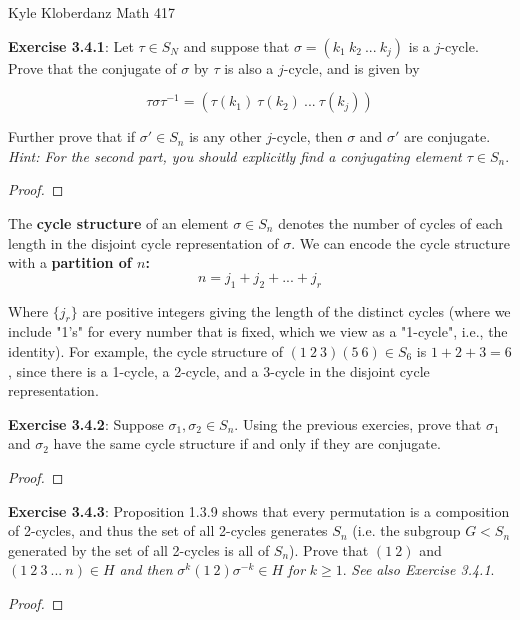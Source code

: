 \documentclass[a4paper]{article}
\begin{document}
\begin{myparindent}{0pt}

Kyle Kloberdanz \newline
Math 417 \newline

\textbf{Exercise 3.4.1}:
  Let $\tau \in S_N$ and suppose that $\sigma = (k_1 ~k_2 ~... ~k_j)$ is a
  $j$-cycle. Prove that the conjugate of $\sigma$ by $\tau$ is also a $j$-cycle,
  and is given by

  \[ \tau \sigma \tau^{-1} = (\tau(k_1) ~\tau(k_2) ~... ~\tau(k_j)) \]

  Further prove that if $\sigma' \in S_n$ is any other $j$-cycle, then $\sigma$
  and $\sigma'$ are conjugate. \textit{Hint: For the second part, you should
  explicitly find a conjugating element $\tau \in S_n$}.
\begin{proof}
\end{proof}

The \textbf{cycle structure} of an element $\sigma \in S_n$ denotes the number
of cycles of each length in the disjoint cycle representation of $\sigma$.
We can encode the cycle structure with a \textbf{partition of $n$:}
\[ n = j_1 + j_2 + ... + j_r \]

Where $\{ j_r \}$ are positive integers giving the length of the distinct cycles
(where we include "1's" for every number that is fixed, which we view as a
"1-cycle", i.e., the identity). For example, the cycle structure of
$(1 ~2 ~3)(5 ~6) \in S_6$ is $1 + 2 + 3 = 6$, since there is a 1-cycle, a
2-cycle, and a 3-cycle in the disjoint cycle representation.
\newline

\textbf{Exercise 3.4.2}:
Suppose $\sigma_1, \sigma_2 \in S_n$. Using the previous exercies, prove that
$\sigma_1$ and $\sigma_2$ have the same cycle structure if and only if they
are conjugate.
\begin{proof}
\end{proof}

\textbf{Exercise 3.4.3}:
Proposition 1.3.9 shows that every permutation is a composition of 2-cycles, and
thus the set of all 2-cycles generates $S_n$ (i.e. the subgroup $G < S_n$
generated by the set of all 2-cycles is all of $S_n$). Prove that $(1 ~2)$ and
$(1 ~2 ~3 ~... ~n) \in H$ \textit{and then} $\sigma^{k}(1 ~2)\sigma^{-k} \in H$
\textit{for} $k \ge 1$. \textit{See also Exercise 3.4.1}.
\begin{proof}
\end{proof}


\end{myparindent}
\end{document}
